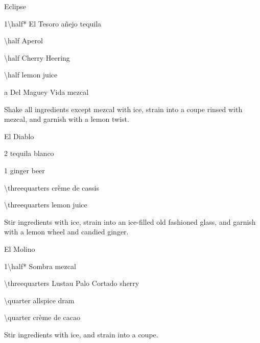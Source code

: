 \begin{Cocktail}[\PDT]{Eclipse}
  \begin{Ingredients}
  \item \SI{1\half*}{\oz} El Tesoro a\~nejo tequila
  \item \SI{\half}{\oz} Aperol
  \item \SI{\half}{\oz} Cherry Heering
  \item \SI{\half}{\oz} lemon juice
  \item a \si{\dash} Del Maguey Vida mezcal
  \end{Ingredients}
  
  \begin{Instructions}
	Shake all ingredients except mezcal with ice, strain into a coupe rinsed with mezcal, and garnish with a lemon twist.
  \end{Instructions}
\end{Cocktail}

\begin{Cocktail}[\PDT]{El Diablo}
  \begin{Ingredients}
  \item \SI{2}{\oz} tequila blanco
  \item \SI{1}{\oz} ginger beer
  \item \SI{\threequarters}{\oz} cr\`eme de cassis
  \item \SI{\threequarters}{\oz} lemon juice
  \end{Ingredients}
  
  \begin{Instructions}
	Stir ingredients with ice, strain into an ice-filled old fashioned glass, and garnish with a lemon wheel and candied ginger.
  \end{Instructions}
\end{Cocktail}

\begin{Cocktail}[\PDT]{El Molino}
  \begin{Ingredients}
  \item \SI{1\half*}{\oz} Sombra mezcal
  \item \SI{\threequarters}{\oz} Lustau Palo Cortado sherry
  \item \SI{\quarter}{\oz} allspice dram
  \item \SI{\quarter}{\oz} cr\`eme de cacao
  \end{Ingredients}
  
  \begin{Instructions}
	Stir ingredients with ice, and strain into a coupe.
  \end{Instructions}
\end{Cocktail}

